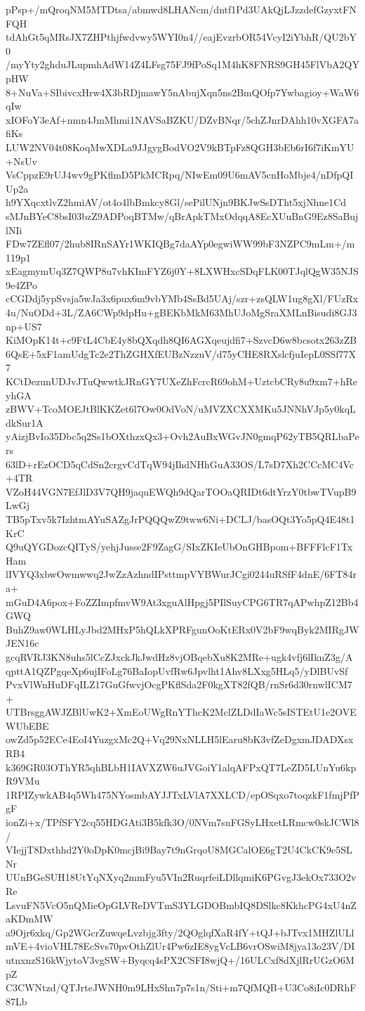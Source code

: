 pPsp+/mQroqNM5MTDtsa/abmwd8LHANcm/dntf1Pd3UAkQjLJzzdefGzyxtFNFQH
tdAhGt5qMRsJX7ZHPthjfwdvwy5WYI0n4//eajEvzrbOR54VcyI2iYbhR/QU2bY0
/myYty2ghduJLupmhAdW14Z4LFsg75FJ9fPoSq1M4hK8FNRS9GH45FlVbA2QYpHW
8+NuVa+SIbivcxHrw4X3bRDjmawY5nAbujXqn5ns2BmQOfp7Ywbagioy+WaW6qIw
xIOFoY3eAf+nmn4JmMhmi1NAVSaBZKU/DZvBNqr/5chZJnrDAhh10vXGFA7afiKs
LUW2NV04t08KoqMwXDLa9JJgygBodVO2V9kBTpFz8QGH3bEb6rI6f7iKmYU+NsUv
VsCppzE9rUJ4wv9gPKflmD5PkMCRpq/NIwEm09U6mAV5cnHoMbje4/nDfpQIUp2a
h9YXqcxtlvZ2hmiAV/ot4o4lbBmkcy8Gl/sePilUNjn9BKJwSsDTht5xjNhne1Cd
sMJnBYeC8bsI03bzZ9ADPoqBTMw/qBrApkTMxOdqqA8EcXUuBnG9Ez8SaBujlNIi
FDw7ZEfl07/2hub8IRnSAYr1WKIQBg7daAYp0egwiWW99bF3NZPC9mLm+/m119p1
xEagmymUq3Z7QWP8u7vhKImFYZ6j0Y+8LXWHxcSDqFLK00TJqlQgW35NJS9e4ZPo
cCGDdj5ypSvsja5wJa3x6pux6m9vbYMb4SsBd5UAj/szr+zsQLW1ug8gXl/FUzRx
4u/NuODd+3L/ZA6CWp9dpHu+gBEKbMkM63MhUJoMgSraXMLnBisudi8GJ3np+US7
KiMOpK14t+c9FtL4CbE4y8bQXqdh8QI6AGXqeujdfi7+SzvcD6w8bcsotx263zZB
6QsE+5xF1amUdgTc2e2ThZGHXfEUBzNzzuV/d75yCHE8RXslcfjuIepL0SSf77X7
KCtDezunUDJvJTuQwwtkJRnGY7UXeZhFcrcR69ohM+UztcbCRy8u9xm7+hReyhGA
zBWV+TcoMOEJtBlKKZet6l7Ow0OdVoN/uMVZXCXXMKu5JNNhVJp5y0kqLdkSur1A
yAizjBvIo35Dbc5q2Ss1bOXthzxQx3+Ovh2AuBxWGvJN0gmqP62yTB5QRLbaPers
63lD+rEzOCD5qCdSn2crgvCdTqW94jIhdNHhGuA33OS/L7sD7Xh2CCcMC4Vc+4TR
VZoH44VGN7EfJlD3V7QH9jaquEWQh9dQarTOOaQRIDt6dtYrzY0tbwTVupB9LwGj
TB5pTxv5k7IzhtmAYuSAZgJrPQQQwZ9tww6Ni+DCLJ/basOQt3Yo5pQ4E48t1KrC
Q9uQYGDozcQITyS/yehjJusse2F9ZagG/SIxZKIeUbOnGHBpom+BFFFlcF1TxHam
lIVYQ3xbwOwmwwq2JwZzAzhndIPsttmpVYBWurJCgi0244uRSfF4dnE/6FT84ra+
mGuD4A6pox+FoZZImpfmvW9At3xguAlHpgj5PIlSuyCPG6TR7qAPwhpZ12Bb4GWQ
BuhZ9aw0WLHLyJbd2MHxP5hQLkXPRFgunOoKtERx0V2bF9wqByk2MIRgJWJEN16c
gcqRVRJ3KN8uhs5lCcZJxckJkJwdHz8vjOBqebXu8K2MRe+ugk4vfj6lIknZ3g/A
qpttA1QZPgqeXp6ujIFoLg76BaIopUvfRw6Jpvlht1Ahv8LXxg5HLq5/yDlBUvSf
PvxVlWnHuDFqILZ17GuGfwvjOcgPKflSda2F0kgXT82fQB/rnSr6d30rnwlICM7+
UTBrsggAWJZBlUwK2+XmEoUWgRnYThcK2MclZLDdIaWc5sISTEtU1e2OVEWUbEBE
owZd5p52ECe4EoI4YuzgxMc2Q+Vq29NxNLLH5lEaru8bK3vfZeDgxmJDADXsxRB4
k369GR03OThYR5qhBLbH1IAVXZW6uJVGoiY1alqAFPxQT7LeZD5LUnYu6kpR9VMu
1RPIZywkAB4q5Wh475NYosmbAYJJTxLVlA7XXLCD/epOSqxo7toqzkF1fmjPfPgF
ionZi+x/TPfSFY2cq55HDGAti3B5kfk3O/0NVm7snFGSyLHxetLRmcw0skJCWl8/
VIejjT8Dxthhd2Y0oDpK0mcjBi9Bay7t9nGrqoU8MGCalOE6gT2U4CkCK9e5SLNr
UUnBGeSUH18UtYqNXyq2mmFyu5VIn2RuqrfeiLDllqmiK6PGvgJ3ekOx733O2vRe
LsvuFN5VcO5nQMieOpGLVReDVTmS3YLGDOBmbIQ8DSlkc8KkhcPG4xU4nZaKDmMW
a9Ojr6xkq/Gp2WGcrZuwqeLvzbjg3fty/2QOglqfXaR4fY+tQJ+bJTvx1MHZlULl
mVE+4vioVHL78EcSvs70pvOthZlUr4Pw6zIE8ygVcLB6vrOSwiM8jya13o23V/DI
utnxnzS16kWjytoV3vgSW+Byqcq4sPX2CSFI8wjQ+/16ULCxf8dXjlRrUGzO6MpZ
C3CWNtzd/QTJrteJWNH0m9LHxShn7p7s1n/Sti+m7QfMQB+U3Co8iIc0DRhF87Lb

